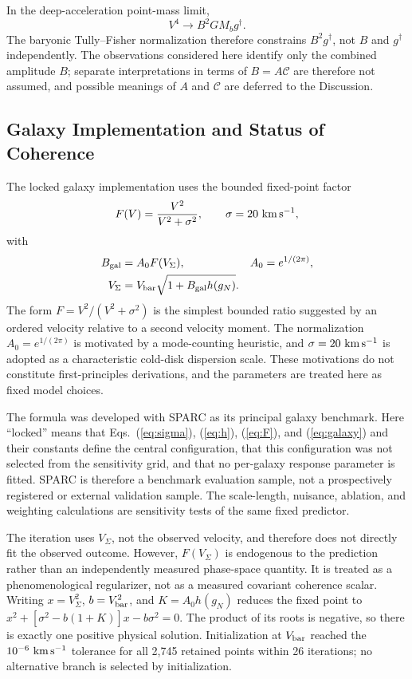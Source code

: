 \documentclass[aps,prd,reprint,superscriptaddress,showpacs,floatfix,longbibliography]{revtex4-2}
\begin{document}
In the deep-acceleration point-mass limit,
\begin{equation}
V^4\rightarrow B^2GM_b g^\dagger .
\label{eq:btfr}
\end{equation}
The baryonic Tully--Fisher normalization therefore constrains $B^2g^\dagger$, not $B$ and $g^\dagger$ independently. The observations considered here identify only the combined amplitude $B$; separate interpretations in terms of $B=A\mathcal C$ are therefore not assumed, and possible meanings of $A$ and $\mathcal C$ are deferred to the Discussion.

\subsection{Galaxy Implementation and Status of Coherence}

The locked galaxy implementation uses the bounded fixed-point factor
\begin{equation}
F(V)=\frac{V^2}{V^2+\sigma^2},
\qquad \sigma=20\ {\rm km\,s^{-1}},
\label{eq:F}
\end{equation}
with
\begin{equation}
\begin{aligned}
B_{\rm gal}&=A_0F(V_\Sigma),&
A_0&=e^{1/(2\pi)},\\
V_\Sigma&=V_{\rm bar}\sqrt{1+B_{\rm gal}h(g_N)}.&&
\end{aligned}
\label{eq:galaxy}
\end{equation}
The form $F=V^2/(V^2+\sigma^2)$ is the simplest bounded ratio suggested by an ordered velocity relative to a second velocity moment. The normalization $A_0=e^{1/(2\pi)}$ is motivated by a mode-counting heuristic, and $\sigma=20\ {\rm km\,s^{-1}}$ is adopted as a characteristic cold-disk dispersion scale. These motivations do not constitute first-principles derivations, and the parameters are treated here as fixed model choices.

The formula was developed with SPARC as its principal galaxy benchmark. Here ``locked'' means that Eqs.~(\ref{eq:sigma}), (\ref{eq:h}), (\ref{eq:F}), and (\ref{eq:galaxy}) and their constants define the central configuration, that this configuration was not selected from the sensitivity grid, and that no per-galaxy response parameter is fitted. SPARC is therefore a benchmark evaluation sample, not a prospectively registered or external validation sample. The scale-length, nuisance, ablation, and weighting calculations are sensitivity tests of the same fixed predictor.

The iteration uses $V_\Sigma$, not the observed velocity, and therefore does not directly fit the observed outcome. However, $F(V_\Sigma)$ is endogenous to the prediction rather than an independently measured phase-space quantity. It is treated as a phenomenological regularizer, not as a measured covariant coherence scalar. Writing $x=V_\Sigma^2$, $b=V_{\rm bar}^2$, and $K=A_0h(g_N)$ reduces the fixed point to $x^2+[\sigma^2-b(1+K)]x-b\sigma^2=0$. The product of its roots is negative, so there is exactly one positive physical solution. Initialization at $V_{\rm bar}$ reached the $10^{-6}\ {\rm km\,s^{-1}}$ tolerance for all 2,745 retained points within 26 iterations; no alternative branch is selected by initialization.
\end{document}
